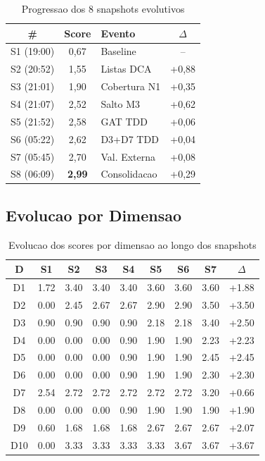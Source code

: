 \begin{table}[H]\centering
\caption{Progressao dos 8 snapshots evolutivos}
\begin{tabular}{@{}cclc@{}}
\toprule
\textbf{\#} & \textbf{Score} & \textbf{Evento} & $\Delta$ \\
\midrule
S1 (19:00) & 0,67 & Baseline & -- \\
S2 (20:52) & 1,55 & Listas DCA & +0,88 \\
S3 (21:01) & 1,90 & Cobertura N1 & +0,35 \\
S4 (21:07) & 2,52 & Salto M3 & +0,62 \\
S5 (21:52) & 2,58 & GAT TDD & +0,06 \\
S6 (05:22) & 2,62 & D3+D7 TDD & +0,04 \\
S7 (05:45) & 2,70 & Val. Externa & +0,08 \\
S8 (06:09) & \textbf{2,99} & Consolidacao & +0,29 \\
\bottomrule
\end{tabular}
\end{table}

\subsection{Evolucao por Dimensao}

\begin{table}[H]\centering\footnotesize
\caption{Evolucao dos scores por dimensao ao longo dos snapshots}
\begin{tabular}{@{}c|c|c|c|c|c|c|c|c@{}}
\toprule
\textbf{D} & \textbf{S1} & \textbf{S2} & \textbf{S3} & \textbf{S4} & \textbf{S5} & \textbf{S6} & \textbf{S7} & $\Delta$ \\
\midrule
D1  & 1.72 & 3.40 & 3.40 & 3.40 & 3.60 & 3.60 & 3.60 & +1.88 \\
D2  & 0.00 & 2.45 & 2.67 & 2.67 & 2.90 & 2.90 & 3.50 & +3.50 \\
D3  & 0.90 & 0.90 & 0.90 & 0.90 & 2.18 & 2.18 & 3.40 & +2.50 \\
D4  & 0.00 & 0.00 & 0.00 & 0.90 & 1.90 & 1.90 & 2.23 & +2.23 \\
D5  & 0.00 & 0.00 & 0.00 & 0.90 & 1.90 & 1.90 & 2.45 & +2.45 \\
D6  & 0.00 & 0.00 & 0.00 & 0.90 & 1.90 & 1.90 & 2.30 & +2.30 \\
D7  & 2.54 & 2.72 & 2.72 & 2.72 & 2.72 & 2.72 & 3.20 & +0.66 \\
D8  & 0.00 & 0.00 & 0.00 & 0.90 & 1.90 & 1.90 & 1.90 & +1.90 \\
D9  & 0.60 & 1.68 & 1.68 & 1.68 & 2.67 & 2.67 & 2.67 & +2.07 \\
D10 & 0.00 & 3.33 & 3.33 & 3.33 & 3.33 & 3.67 & 3.67 & +3.67 \\
\bottomrule
\end{tabular}
\end{table}

